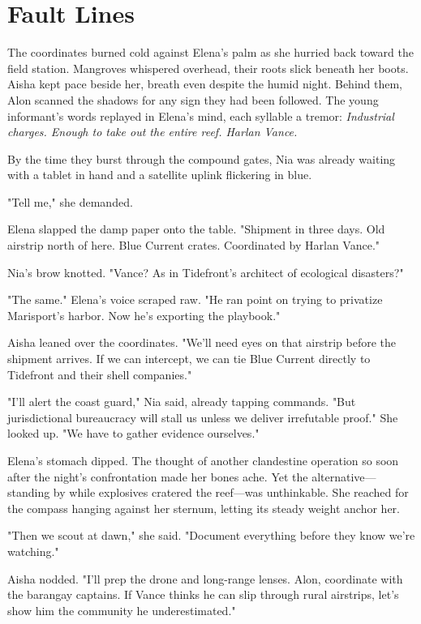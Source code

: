 \chapter{Fault Lines}

The coordinates burned cold against Elena's palm as she hurried back toward the field station. Mangroves whispered overhead, their roots slick beneath her boots. Aisha kept pace beside her, breath even despite the humid night. Behind them, Alon scanned the shadows for any sign they had been followed. The young informant's words replayed in Elena's mind, each syllable a tremor: \textit{Industrial charges. Enough to take out the entire reef. Harlan Vance.}

By the time they burst through the compound gates, Nia was already waiting with a tablet in hand and a satellite uplink flickering in blue.

"Tell me," she demanded.

Elena slapped the damp paper onto the table. "Shipment in three days. Old airstrip north of here. Blue Current crates. Coordinated by Harlan Vance."

Nia's brow knotted. "Vance? As in Tidefront's architect of ecological disasters?"

"The same." Elena's voice scraped raw. "He ran point on trying to privatize Marisport's harbor. Now he's exporting the playbook."

Aisha leaned over the coordinates. "We'll need eyes on that airstrip before the shipment arrives. If we can intercept, we can tie Blue Current directly to Tidefront and their shell companies."

"I'll alert the coast guard," Nia said, already tapping commands. "But jurisdictional bureaucracy will stall us unless we deliver irrefutable proof." She looked up. "We have to gather evidence ourselves."

Elena's stomach dipped. The thought of another clandestine operation so soon after the night's confrontation made her bones ache. Yet the alternative—standing by while explosives cratered the reef—was unthinkable. She reached for the compass hanging against her sternum, letting its steady weight anchor her.

"Then we scout at dawn," she said. "Document everything before they know we're watching."

Aisha nodded. "I'll prep the drone and long-range lenses. Alon, coordinate with the barangay captains. If Vance thinks he can slip through rural airstrips, let's show him the community he underestimated."

